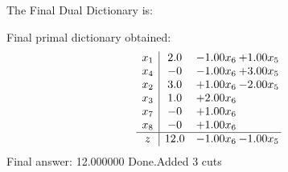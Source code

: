 \documentclass[8pt]{article}
\begin{document}
The Final Dual Dictionary is: 

 Final primal dictionary obtained: 
\[\begin{array}{c| c c@{\hskip 2pt} c@{\hskip 2pt} }
 x_{1}   &  2.0 & -1.00 x_{6} & +  1.00 x_{5}\\
 x_{4}   &  -0 & -1.00 x_{6} & +  3.00 x_{5}\\
 x_{2}   &  3.0 & +  1.00 x_{6} & -2.00 x_{5}\\
 x_{3}   &  1.0 & +  2.00 x_{6} &   \\
 x_{7}   &  -0 & +  1.00 x_{6} &   \\
 x_{8}   &  -0 & +  1.00 x_{6} &   \\
\hline
z    &  12.0 & -1.00 x_{6} & -1.00 x_{5}\\
\end{array}\]
 Final answer: 12.000000 
Done.Added 3 cuts 
\end{document}
